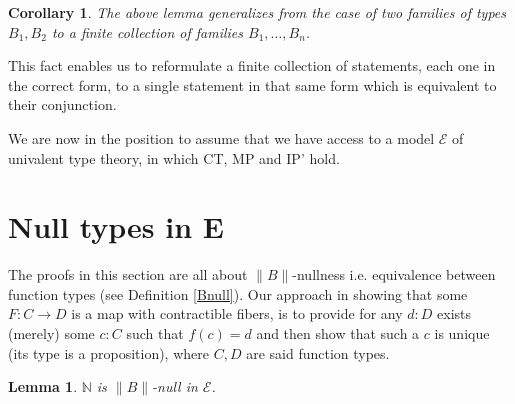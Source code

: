\documentclass[12pt]{report}
\newtheorem{lem}[thm]{Lemma}
\newtheorem{cor}[thm]{Corollary}
\begin{document}
\begin{cor}
The above lemma generalizes from the case of two families of types $B_1, B_2$ to a finite collection of families $B_1,\ldots,B_n$. 
\end{cor}
This fact enables us to reformulate a finite collection of statements, each one in the correct form, to a single statement in that same form which is equivalent to their conjunction. 

We are now in the position to assume that we have access to a model $\mathcal{E}$ of univalent type theory, in which CT, MP and IP' hold. 

\section{Null types in E}
The proofs in this section are all about $\lVert B \rVert$-nullness i.e. equivalence between function types (see Definition \ref{Bnull}). 
Our approach in showing that some $F: C\rightarrow D$ is a map with contractible fibers, is to provide for any $d :D$ exists (merely) some $c :C$ such that $f(c) = d$ and then show that such a $c$ is unique (its type is a proposition), where $C,D$ are said function types. 
\begin{lem}\label{NisBnull}
$\mathbb{N}$ is $\lVert B \rVert$-null in $\mathcal{E}$.
\end{lem}
\end{document}

